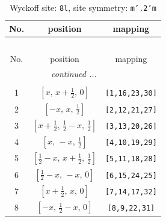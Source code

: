 \documentclass[fleqn,8pt]{jsarticle}
\begin{document}
\begin{longtable}{ccc}
\caption{Wyckoff site: {\tt 8l}, site symmetry: {\tt m'.2'm}}
 \\
 \hline \hline
No. & position & mapping \\ \hline \endfirsthead

\multicolumn{2}{l}{\tablename\ \thetable{}} \\
 \hline \hline
No. & position & mapping \\ \hline \endhead

 \hline \hline
\multicolumn{2}{r}{\footnotesize\it continued ...} \\ \endfoot

 \hline \hline
\multicolumn{2}{r}{} \\ \endlastfoot

1 & $\left[ x,\, x + \frac{1}{2},\, 0 \right]$ & {\tt [1,16,23,30]} \\ \hline
2 & $\left[ - x,\, x,\, \frac{1}{2} \right]$ & {\tt [2,12,21,27]} \\ \hline
3 & $\left[ x + \frac{1}{2},\, \frac{1}{2} - x,\, \frac{1}{2} \right]$ & {\tt [3,13,20,26]} \\ \hline
4 & $\left[ x,\, - x,\, \frac{1}{2} \right]$ & {\tt [4,10,19,29]} \\ \hline
5 & $\left[ \frac{1}{2} - x,\, x + \frac{1}{2},\, \frac{1}{2} \right]$ & {\tt [5,11,18,28]} \\ \hline
6 & $\left[ \frac{1}{2} - x,\, - x,\, 0 \right]$ & {\tt [6,15,24,25]} \\ \hline
7 & $\left[ x + \frac{1}{2},\, x,\, 0 \right]$ & {\tt [7,14,17,32]} \\ \hline
8 & $\left[ - x,\, \frac{1}{2} - x,\, 0 \right]$ & {\tt [8,9,22,31]} \\
\end{longtable}
\renewcommand{\arraystretch}{1.2}
\end{document}
